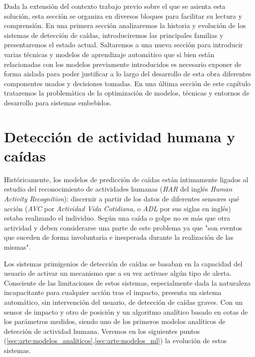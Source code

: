 %

Dada la extensión del contexto trabajo previo sobre el que se asienta esta solución, esta sección se organiza en diversos bloques para facilitar su lectura y comprensión. En una primera sección analizaremos la historia y evolución de los sistemas de detección de caídas, introduciremos las principales familias y presentaremos el estado actual. Saltaremos a una nueva sección para introducir varias técnicas y modelos de aprendizaje automático que si bien están relacionadas con los modelos previamente introducidos es necesario exponer de forma aislada para poder justificar a lo largo del desarrollo de esta obra diferentes componentes usados y decisiones tomadas. En una última sección de este capítulo trataremos la problemática de la optimización de modelos, técnicas y entornos de desarrollo para sistemas embebidos.


\section{Detección de actividad humana y caídas}\label{sec:arte:detección_caídas}

Históricamente, los modelos de predicción de caídas están íntimamente ligados al estudio del reconocimiento de actividades humanas (\textit{HAR} del inglés \textit{Human Activity Recognition}): discernir a partir de los datos de diferentes sensores qué acción (\textit{AVC} por \textit{Actividad Vida Cotidiana}, o \textit{ADL} por sus siglas en inglés) estaba realizando el individuo. Según  una caída o golpe no es más que otra actividad y deben considerarse una parte de este problema ya que "son eventos que suceden de forma involuntaria e inesperada durante la realización de las mismas".

Los sistemas primigenios de detección de caídas se basaban en la capacidad del usuario de activar un mecanismo que a su vez activase algún tipo de alerta. Consciente de las limitaciones de estos sistemas, especialmente dada la naturaleza incapacitante para cualquier acción tras el impacto,  presenta un sistema automático, sin intervención del usuario, de detección de caídas graves. Con un sensor de impacto y otro de posición y un algoritmo analítico basado en cotas de los parámetros medidos, siendo uno de los primeros modelos analíticos de detección de actividad humana. Veremos en los siguientes puntos (\ref{sec:arte:modelos_analiticos},\ref{sec:arte:modelos_ml}) la evolución de estos sistemas.

